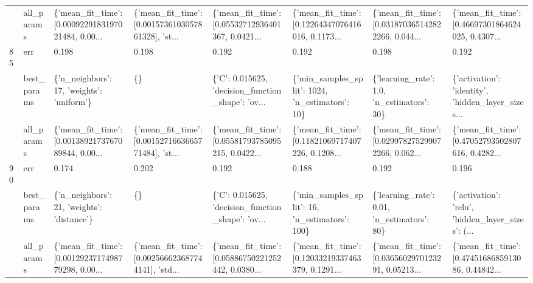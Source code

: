 \begin{tabular}{llllllll}
    & all\_params &  \{'mean\_fit\_time': [0.0009229183197021484, 0.00... &  \{'mean\_fit\_time': [0.0015736103057861328], 'st... &  \{'mean\_fit\_time': [0.05532712936401367, 0.0421... &  \{'mean\_fit\_time': [0.12264347076416016, 0.1173... &  \{'mean\_fit\_time': [0.031870365142822266, 0.044... &  \{'mean\_fit\_time': [0.46697301864624025, 0.4307... \\
85  & err &                                              0.198 &                                              0.198 &                                              0.192 &                                              0.192 &                                              0.198 &                                              0.192 \\
    & best\_params &          \{'n\_neighbors': 17, 'weights': 'uniform'\} &                                                 \{\} &  \{'C': 0.015625, 'decision\_function\_shape': 'ov... &    \{'min\_samples\_split': 1024, 'n\_estimators': 10\} &         \{'learning\_rate': 1.0, 'n\_estimators': 30\} &  \{'activation': 'identity', 'hidden\_layer\_sizes... \\
    & all\_params &  \{'mean\_fit\_time': [0.0013892173767089844, 0.00... &  \{'mean\_fit\_time': [0.0015271663665771484], 'st... &  \{'mean\_fit\_time': [0.05581793785095215, 0.0422... &  \{'mean\_fit\_time': [0.11821069717407226, 0.1208... &  \{'mean\_fit\_time': [0.029978275299072266, 0.062... &  \{'mean\_fit\_time': [0.47052793502807616, 0.4282... \\
90  & err &                                              0.174 &                                              0.202 &                                              0.192 &                                              0.188 &                                              0.192 &                                              0.196 \\
    & best\_params &         \{'n\_neighbors': 21, 'weights': 'distance'\} &                                                 \{\} &  \{'C': 0.015625, 'decision\_function\_shape': 'ov... &     \{'min\_samples\_split': 16, 'n\_estimators': 100\} &        \{'learning\_rate': 0.01, 'n\_estimators': 80\} &  \{'activation': 'relu', 'hidden\_layer\_sizes': (... \\
    & all\_params &  \{'mean\_fit\_time': [0.0012923717498779298, 0.00... &  \{'mean\_fit\_time': [0.002566623687744141], 'std... &  \{'mean\_fit\_time': [0.05886750221252442, 0.0380... &  \{'mean\_fit\_time': [0.12033219337463379, 0.1291... &  \{'mean\_fit\_time': [0.0365602970123291, 0.05213... &  \{'mean\_fit\_time': [0.4745168685913086, 0.44842... \\

\end{tabular}

